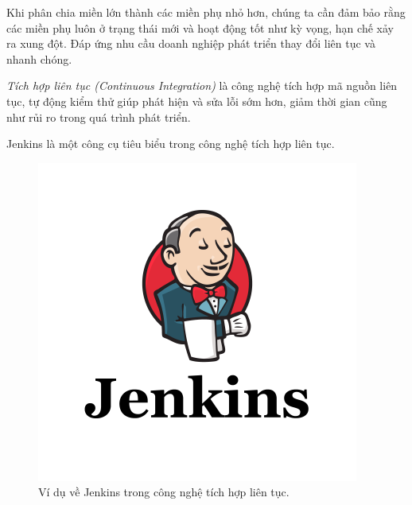 Khi  phân chia miền lớn thành các miền phụ nhỏ hơn, chúng ta cần đảm bảo rằng các miền phụ   luôn ở trạng thái mới  và hoạt động tốt    như kỳ vọng, hạn chế  xảy ra xung đột.   Đáp ứng nhu cầu doanh nghiệp phát triển thay đổi liên tục và nhanh chóng.

\emph{Tích hợp liên tục (Continuous Integration)} là công nghệ tích hợp mã nguồn liên tục, tự động kiểm thử giúp phát hiện và sửa lỗi sớm hơn, giảm thời gian cũng như rủi ro trong quá trình phát triển.

\begin{example} Jenkins là một công cụ tiêu biểu trong công nghệ tích hợp liên tục. \end{example}

\begin{figure}[H]

\centering

\includegraphics[scale = 0.4]{pictures/_vi_du_ve_jenkins_trong_cong_nghe_tich_hop_lien_tuc/main.png}

\caption{Ví dụ về Jenkins trong công nghệ tích hợp liên tục.}

\end{figure} 